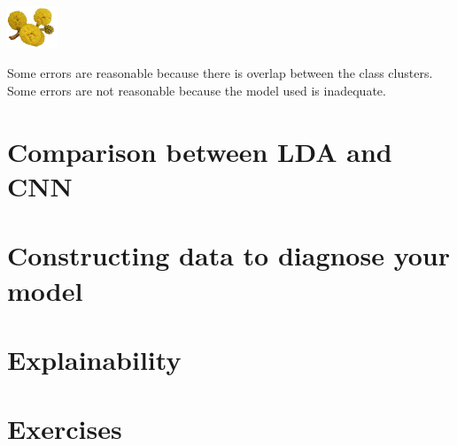 \documentclass[
  letterpaper,
]{krantz}
\newcommand{\infobox}[1]{%
\noindent\colorbox{info!30}{%
\begin{minipage}{0.98\linewidth}%
    \centering%
    \begin{minipage}[c]{0.15\linewidth} %
      \includegraphics[width=1.5cm]{images/mulga-flowers2.png} %
    \end{minipage}%
    \hfill %
    \begin{minipage}[c]{0.8\linewidth} %
      \bigskip%
      \textsf{#1}%
      \bigskip%
    \end{minipage}%
    \hspace*{3mm}%
  \end{minipage}%
}%
}
\begin{document}
\infobox{Some errors are reasonable because there is overlap between the class clusters. Some errors are not reasonable because the model used is inadequate.
}

\section{Comparison between LDA and
CNN}\label{comparison-between-lda-and-cnn}

\section{Constructing data to diagnose your
model}\label{constructing-data-to-diagnose-your-model}

\section{Explainability}\label{explainability}

\section*{Exercises}\label{exercises-17}

\end{document}
